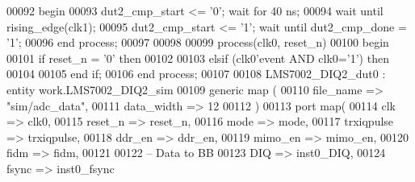 \begin{DoxyCode}
00092 \textcolor{vhdlkeyword}{    begin}
00093         \textcolor{vhdlchar}{dut2_cmp_start} \textcolor{vhdlchar}{<=} \textcolor{vhdlchar}{'}\textcolor{vhdllogic}{}\textcolor{vhdllogic}{0}\textcolor{vhdlchar}{'}; \textcolor{keywordflow}{wait} \textcolor{keywordflow}{for} \textcolor{vhdllogic}{}\textcolor{vhdllogic}{40} \textcolor{vhdlchar}{ns};
00094       \textcolor{keywordflow}{wait} \textcolor{keywordflow}{until} \textcolor{vhdlchar}{rising\_edge}\textcolor{vhdlchar}{(}\textcolor{vhdlchar}{clk1}\textcolor{vhdlchar}{)};
00095         \textcolor{vhdlchar}{dut2_cmp_start} \textcolor{vhdlchar}{<=} \textcolor{vhdlchar}{'}\textcolor{vhdllogic}{}\textcolor{vhdllogic}{1}\textcolor{vhdlchar}{'}; \textcolor{keywordflow}{wait} \textcolor{keywordflow}{until}  \textcolor{vhdlchar}{dut2_cmp_done} \textcolor{vhdlchar}{=} \textcolor{vhdlchar}{'}\textcolor{vhdllogic}{}\textcolor{vhdllogic}{1}\textcolor{vhdlchar}{'};
00096     \textcolor{keywordflow}{end} \textcolor{keywordflow}{process};
00097    
00098    
00099  \textcolor{keywordflow}{process}(clk0, reset_n)
00100 \textcolor{vhdlkeyword}{   begin}
00101       \textcolor{keywordflow}{if} \textcolor{vhdlchar}{reset_n} \textcolor{vhdlchar}{=} \textcolor{vhdlchar}{'}\textcolor{vhdllogic}{}\textcolor{vhdllogic}{0}\textcolor{vhdlchar}{'} \textcolor{keywordflow}{then} 
00102          
00103       \textcolor{keywordflow}{elsif} \textcolor{vhdlchar}{(}\textcolor{vhdlchar}{clk0}\textcolor{vhdlchar}{'}\textcolor{vhdlkeyword}{event} \textcolor{keywordflow}{AND} \textcolor{vhdlchar}{clk0}\textcolor{vhdlchar}{=}\textcolor{vhdlchar}{'}\textcolor{vhdllogic}{}\textcolor{vhdllogic}{1}\textcolor{vhdlchar}{'}\textcolor{vhdlchar}{)} \textcolor{keywordflow}{then} 
00104          
00105       \textcolor{keywordflow}{end} \textcolor{keywordflow}{if};
00106    \textcolor{keywordflow}{end} \textcolor{keywordflow}{process};
00107    
00108    LMS7002\_DIQ2\_dut0 : \textcolor{keywordflow}{entity} work.LMS7002_DIQ2_sim 
00109 \textcolor{keywordflow}{generic} \textcolor{keywordflow}{map} (
00110     file_name => \textcolor{keyword}{"sim/adc\_data"},
00111     data_width => \textcolor{vhdllogic}{12}
00112 \textcolor{vhdlchar}{)}
00113 \textcolor{keywordflow}{port} \textcolor{keywordflow}{map}(
00114     clk         => clk0,
00115     reset_n     => reset_n, 
00116     mode            => mode,
00117     trxiqpulse  => trxiqpulse,
00118     ddr_en      => ddr_en, 
00119     mimo_en     => mimo_en,
00120     fidm            => fidm, 
00121 
00122 \textcolor{keyword}{    -- Data to BB}
00123     DIQ             => inst0_DIQ,
00124     fsync           => inst0_fsync

\end{DoxyCode}
